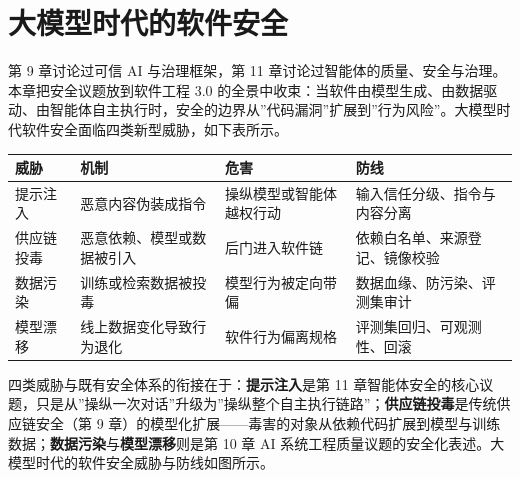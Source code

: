 \documentclass[
]{ctexbook}
\newcounter{none}
\begin{document}
\section{大模型时代的软件安全}\label{ux5927ux6a21ux578bux65f6ux4ee3ux7684ux8f6fux4ef6ux5b89ux5168}

第 9 章讨论过可信 AI 与治理框架，第 11
章讨论过智能体的质量、安全与治理。本章把安全议题放到软件工程 3.0
的全景中收束：当软件由模型生成、由数据驱动、由智能体自主执行时，安全的边界从''代码漏洞''扩展到''行为风险''。大模型时代软件安全面临四类新型威胁，如下表所示。

{\def\LTcaptype{none} %
\begin{longtable}[]{@{}
  >{\raggedright\arraybackslash}p{}
  >{\raggedright\arraybackslash}p{}
  >{\raggedright\arraybackslash}p{}
  >{\raggedright\arraybackslash}p{}@{}}
\toprule\noalign{}
\begin{minipage}[b]{\linewidth}\raggedright
威胁
\end{minipage} & \begin{minipage}[b]{\linewidth}\raggedright
机制
\end{minipage} & \begin{minipage}[b]{\linewidth}\raggedright
危害
\end{minipage} & \begin{minipage}[b]{\linewidth}\raggedright
防线
\end{minipage} \\
\midrule\noalign{}
\endhead
\bottomrule\noalign{}
\endlastfoot
提示注入 & 恶意内容伪装成指令 & 操纵模型或智能体越权行动 &
输入信任分级、指令与内容分离 \\
供应链投毒 & 恶意依赖、模型或数据被引入 & 后门进入软件链 &
依赖白名单、来源登记、镜像校验 \\
数据污染 & 训练或检索数据被投毒 & 模型行为被定向带偏 &
数据血缘、防污染、评测集审计 \\
模型漂移 & 线上数据变化导致行为退化 & 软件行为偏离规格 &
评测集回归、可观测性、回滚 \\
\end{longtable}
}

四类威胁与既有安全体系的衔接在于：\textbf{提示注入}是第 11
章智能体安全的核心议题，只是从''操纵一次对话''升级为''操纵整个自主执行链路''；\textbf{供应链投毒}是传统供应链安全（第
9
章）的模型化扩展------毒害的对象从依赖代码扩展到模型与训练数据；\textbf{数据污染}与\textbf{模型漂移}则是第
10 章 AI
系统工程质量议题的安全化表述。大模型时代的软件安全威胁与防线如图所示。
\end{document}
